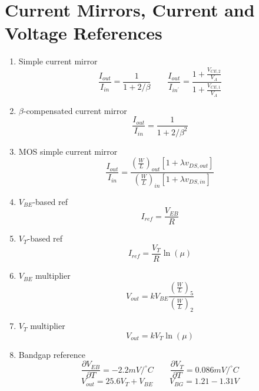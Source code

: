 \documentclass{article}
\begin{document}
\section{Current Mirrors, Current and Voltage References}
\begin{enumerate}
	\item Simple current mirror \[\frac{I_{out}}{I_{in}}=\frac{1}{1+2/\beta} \quad \quad \frac{I_{out}}{I_{in^{'}}}=\frac{1+\frac{V_{CE,2}}{V_{A}}}{1+\frac{V_{CE,1}}{V_{A}}} \]
	\item $\beta$-compensated current mirror \[\frac{I_{out}}{I_{in}}=\frac{1}{1+2/\beta^{2}}\]
	\item MOS simple current mirror \[\frac{I_{out}}{I_{in}}=\frac{(\frac{W}{L})_{out}[1+\lambda v_{DS,out}]}{(\frac{W}{L})_{in}[1+\lambda v_{DS,in}]}\]
	\item $V_{BE}$-based ref \[I_{ref}=\frac{V_{EB}}{R}\]
	\item $V_{T}$-based ref \[I_{ref}=\frac{V_{T}}{R}\ln(\mu)\]
	\item $V_{BE}$ multiplier \[V_{out}=kV_{BE}\frac{(\frac{W}{L})_{5}}{(\frac{W}{L})_{2}}\]
	\item $V_{T}$ multiplier \[V_{out}=kV_{T}\ln(\mu)\]
	\item Bandgap reference \[\frac{\partial V_{EB}}{\partial T}=-2.2mV/ ^{\circ} C \quad \quad \frac{\partial V_{T}}{\partial T}=0.086mV/ ^{\circ} C\]
\[V_{out}=25.6V_{T}+V_{BE} \quad \quad V_{BG}=1.21-1.31V\]
\end{enumerate}
\end{document}
